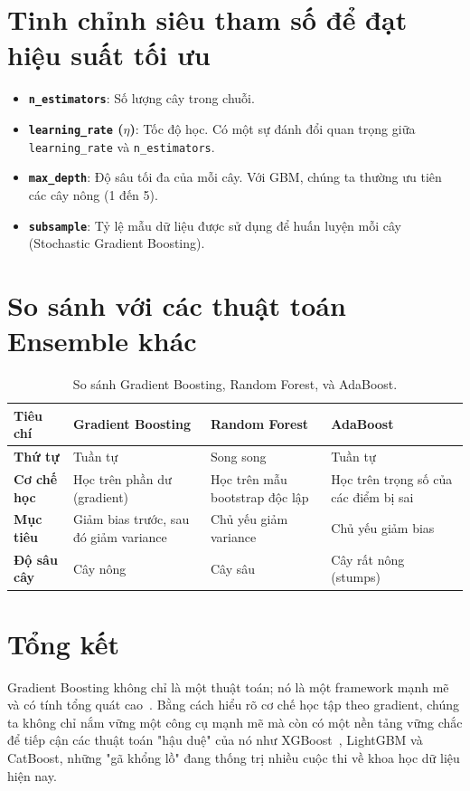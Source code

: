 \section{Tinh chỉnh siêu tham số để đạt hiệu suất tối ưu}
\begin{itemize}
    \item \textbf{\texttt{n\_estimators}}: Số lượng cây trong chuỗi.
    \item \textbf{\texttt{learning\_rate} ($\eta$)}: Tốc độ học. Có một sự đánh đổi quan trọng giữa \texttt{learning\_rate} và \texttt{n\_estimators}.
    \item \textbf{\texttt{max\_depth}}: Độ sâu tối đa của mỗi cây. Với GBM, chúng ta thường ưu tiên các cây nông (1 đến 5).
    \item \textbf{\texttt{subsample}}: Tỷ lệ mẫu dữ liệu được sử dụng để huấn luyện mỗi cây (Stochastic Gradient Boosting).
\end{itemize}

\section{So sánh với các thuật toán Ensemble khác}
\begin{table}[H]
\centering
\caption{So sánh Gradient Boosting, Random Forest, và AdaBoost.}
\begin{tabular}{l|p{3.5cm}|p{3.5cm}|p{3.5cm}}
\toprule
\textbf{Tiêu chí} & \textbf{Gradient Boosting} & \textbf{Random Forest}~\cite{breiman2001random} & \textbf{AdaBoost} \\
\midrule
\textbf{Thứ tự} & Tuần tự & Song song & Tuần tự \\
\textbf{Cơ chế học} & Học trên phần dư (gradient) & Học trên mẫu bootstrap độc lập & Học trên trọng số của các điểm bị sai \\
\textbf{Mục tiêu} & Giảm bias trước, sau đó giảm variance & Chủ yếu giảm variance & Chủ yếu giảm bias \\
\textbf{Độ sâu cây} & Cây nông & Cây sâu & Cây rất nông (stumps) \\
\bottomrule
\end{tabular}
\label{tab:comparison}
\end{table}

\section{Tổng kết}
Gradient Boosting không chỉ là một thuật toán; nó là một framework mạnh mẽ và có tính tổng quát cao~\cite{friedman2001greedy}. Bằng cách hiểu rõ cơ chế học tập theo gradient, chúng ta không chỉ nắm vững một công cụ mạnh mẽ mà còn có một nền tảng vững chắc để tiếp cận các thuật toán "hậu duệ" của nó như XGBoost~\cite{chen2016xgboost}, LightGBM và CatBoost, những "gã khổng lồ" đang thống trị nhiều cuộc thi về khoa học dữ liệu hiện nay.
